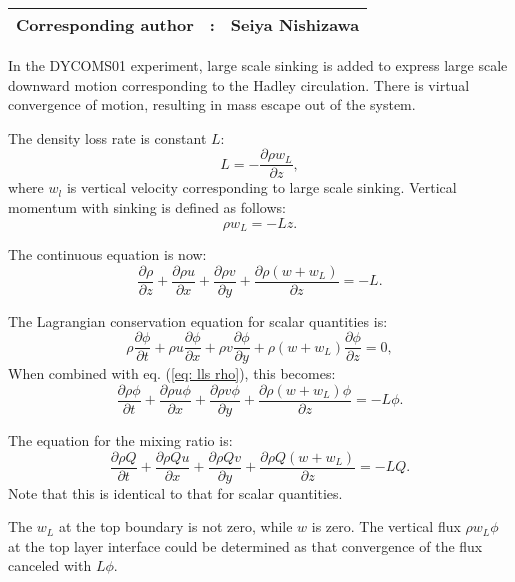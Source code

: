 {\bf \Large 
\begin{tabular}{ccc}
\hline
  Corresponding author & : & Seiya Nishizawa\\
\hline
\end{tabular}
}


In the DYCOMS01 experiment, large scale sinking is added to express large scale downward motion corresponding to the Hadley circulation. There is virtual convergence of motion, resulting in mass escape out of the system.

The density loss rate is constant $L$:
\begin{equation}
  L = -\frac{\partial \rho w_L}{\partial z},
\end{equation}
where $w_l$ is vertical velocity corresponding to large scale sinking.
Vertical momentum with sinking is defined as follows:
\begin{equation}
  \rho w_L = -Lz.
\end{equation}

The continuous equation is now:
\begin{equation}
  \frac{\partial \rho}{\partial z}
  + \frac{\partial \rho u}{\partial x}
  + \frac{\partial \rho v}{\partial y}
  + \frac{\partial \rho (w+w_L)}{\partial z}
  = -L.
  \label{eq: lls rho}
\end{equation}

The Lagrangian conservation equation for scalar quantities is:
\begin{equation}
  \rho\frac{\partial \phi}{\partial t}
  + \rho u\frac{\partial \phi}{\partial x}
  + \rho v\frac{\partial \phi}{\partial y}
  + \rho (w+w_L)\frac{\partial \phi}{\partial z}
  = 0,
\end{equation}
When combined with eq. (\ref{eq: lls rho}), this becomes:
\begin{equation}
  \frac{\partial \rho\phi}{\partial t}
  + \frac{\partial \rho u \phi}{\partial x}
  + \frac{\partial \rho v \phi}{\partial y}
  + \frac{\partial \rho (w+w_L) \phi}{\partial z}
  = -L\phi.
\end{equation}

The equation for the mixing ratio is:
\begin{equation}
  \frac{\partial \rho Q}{\partial t}
  + \frac{\partial \rho Q u }{\partial x}
  + \frac{\partial \rho Q v}{\partial y}
  + \frac{\partial \rho Q (w+w_L)}{\partial z}
  = -L Q.
\end{equation}
Note that this is identical to that for scalar quantities.

The $w_L$ at the top boundary is not zero, while $w$ is zero.
The vertical flux $\rho w_L \phi$ at the top layer interface could be determined as that convergence of the flux canceled with $L\phi$.



